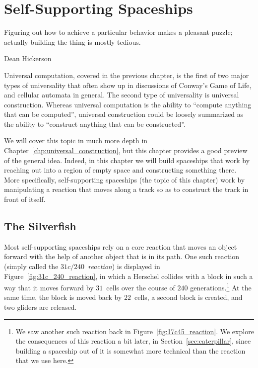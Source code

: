 
\renewcommand{\chapterfolder}{self_support_spaceships/}
\chapter{Self-Supporting Spaceships}\label{chp:self_support_spaceships}


\vspace*{-0.4in}
\epigraph{Figuring out how to achieve a particular behavior makes a pleasant puzzle; actually building the thing is mostly tedious.}{Dean Hickerson}
\vspace*{0.4in}


\noindent Universal computation, covered in the previous chapter, is the first of two major types of universality that often show up in discussions of Conway's Game of Life, and cellular automata in general. The second type of universality is universal construction. Whereas universal computation is the ability to ``compute anything that can be computed'', universal construction could be loosely summarized as the ability to ``construct anything that can be constructed''.

We will cover this topic in much more depth in Chapter~\ref{chp:universal_construction}, but this chapter provides a good preview of the general idea. Indeed, in this chapter we will build spaceships that work by reaching out into a region of empty space and constructing something there. More specifically, self-supporting spaceships (the topic of this chapter) work by manipulating a reaction that moves along a track so as to construct the track in front of itself.


\section{The Silverfish}\label{sec:silverfish}

Most self-supporting spaceships rely on a core reaction that moves an object forward with the help of another object that is in its path. One such reaction (simply called the \emph{$31c/240$~reaction}) is displayed in Figure~\ref{fig:31c_240_reaction}, in which a Herschel collides with a block in such a way that it moves forward by $31$~cells over the course of $240$ generations.\footnote{We saw another such reaction back in Figure~\ref{fig:17c45_reaction}. We explore the consequences of this reaction a bit later, in Section~\ref{sec:caterpillar}, since building a spaceship out of it is somewhat more technical than the reaction that we use here.} At the same time, the block is moved back by $22$~cells, a second block is created, and two gliders are released.

